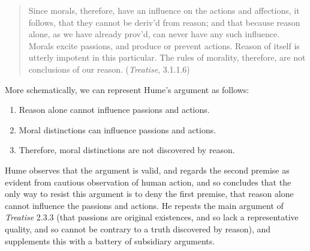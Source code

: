 \begin{quote}
    Since morals, therefore, have an influence on the actions and affections, it follows, that they cannot be deriv'd from reason; and that because reason alone, as we have already prov'd, can never have any such influence. Morals excite passions, and produce or prevent actions. Reason of itself is utterly impotent in this particular. The rules of morality, therefore, are not conclusions of our reason. (\emph{Treatise}, 3.1.1.6)
\end{quote}


More schematically, we can represent Hume's argument as follows:

\begin{enumerate}
    \item Reason alone cannot influence passions and actions.
    \item Moral distinctions can influence passions and actions.
    \item Therefore, moral distinctions are not discovered by reason.
\end{enumerate}

Hume observes that the argument is valid, and regards the second premise as evident from cautious observation of human action, and so concludes that the only way to resist this argument is to deny the first premise, that reason alone cannot influence the passions and actions. He repeats the main argument of \emph{Treatise} 2.3.3 (that passions are original existences, and so lack a representative quality, and so cannot be contrary to a truth discovered by reason), and supplements this with a battery of subsidiary arguments. \change

% 

